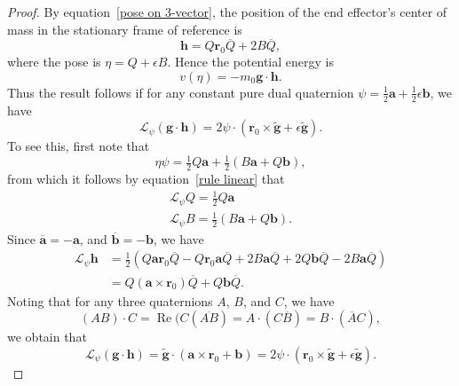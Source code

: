 \documentclass[reqno,12pt]{amsart}
\DeclareMathOperator\realpart{Re}
\newcommand{\liederiv}{\mathcal L}
\begin{document}
\begin{proof}  By equation~\eqref{pose on 3-vector}, the position of the end effector's center of mass in the stationary frame of reference is
\begin{equation}
\bm h = Q \bm r_0 \overline Q + 2 B\overline Q,
\end{equation}
where the pose is $\eta = Q + \epsilon B$.  Hence the potential energy is
\begin{equation}
v (\eta) = - m_0 \bm g \cdot \bm h .
\end{equation}
Thus the result follows if for any constant pure dual quaternion $\psi = \tfrac12\bm a + \tfrac12 \epsilon \bm b$, we have
\begin{equation}
\liederiv_\psi (\bm g \cdot \bm h)
= 2 \psi \cdot (\bm r_0 \times \tilde{\bm g} + \epsilon \tilde{\bm g}) .
\end{equation}
To see this, first note that
\begin{equation}
\eta \psi = \tfrac12 Q \bm a + \tfrac12 (B \bm a + Q \bm b) ,
\end{equation}
from which it follows by equation~\eqref{rule linear} that
\begin{gather}
\liederiv_\psi Q = \tfrac12 Q \bm a \\
\liederiv_\psi B = \tfrac12 (B \bm a + Q \bm b) .
\end{gather}
Since $\overline{\bm a} = -\bm a$, and $\overline{\bm b} = - \bm b$, we have
\begin{equation}
\begin{aligned}
\liederiv_\psi \bm h &= 
\tfrac12(
Q \bm a \bm r_0 \overline Q - Q \bm r_0 \bm a \overline Q + 2 B \bm a \overline Q + 2 Q \bm b \overline Q - 2 B \bm a \overline Q ) \\
&= Q(\bm a \times \bm r_0)\overline Q + Q \bm b \overline Q .
\end{aligned}
\end{equation}
Noting that for any three quaternions $A$, $B$, and $C$, we have
\begin{equation}
(AB)\cdot C = \realpart(C (\overline{AB})= A \cdot (C \overline B) = B \cdot (\overline A C),
\end{equation}
we obtain that
\begin{equation}
\liederiv_\psi (\bm g \cdot \bm h) = \tilde{\bm g} \cdot (\bm a \times \bm r_0 + \bm b) = 2 \psi \cdot (\bm r_0 \times \tilde{\bm g} + \epsilon \tilde{\bm g}) .
\end{equation}
\end{proof}
\end{document}
